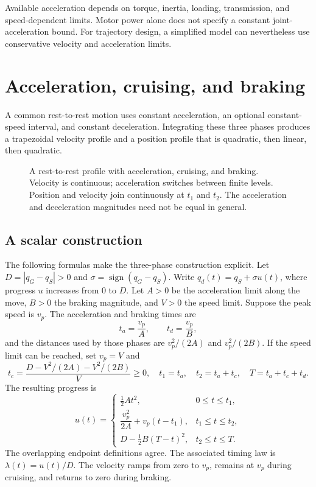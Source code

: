 Available acceleration depends on torque, inertia, loading, transmission,
and speed-dependent limits. Motor power alone does not specify a constant
joint-acceleration bound. For trajectory design, a simplified model can
nevertheless use conservative velocity and acceleration limits.

\section{Acceleration, cruising, and braking}
\label{sec:l12-trapezoid}
A common rest-to-rest motion uses constant acceleration, an optional
constant-speed interval, and constant deceleration. Integrating these
three phases produces a trapezoidal velocity profile and a position
profile that is quadratic, then linear, then quadratic.

\begin{figure}[htbp]
\centering
\caption{A rest-to-rest profile with acceleration, cruising, and braking.
Velocity is continuous; acceleration switches between finite levels.
Position and velocity join continuously at $t_1$ and $t_2$. The acceleration
and deceleration magnitudes need not be equal in general.}
\label{fig:l12-trapezoid}
\end{figure}

\subsection{A scalar construction}
The following formulas make the three-phase construction explicit. Let
$D=|q_G-q_S|>0$ and $\sigma=\operatorname{sign}(q_G-q_S)$.
Write $q_d(t)=q_S+\sigma u(t)$, where progress $u$ increases from 0 to $D$.
Let $A>0$ be the acceleration limit along the move, $B>0$ the braking
magnitude, and $V>0$ the speed limit. Suppose the peak speed is $v_p$.
The acceleration and braking times are
\[
 t_a=\frac{v_p}{A},\qquad t_d=\frac{v_p}{B},
\]
and the distances used by those phases are $v_p^2/(2A)$ and $v_p^2/(2B)$.
If the speed limit can be reached, set $v_p=V$ and
\begin{equation}
 t_c=\frac{D-V^2/(2A)-V^2/(2B)}{V}\ge0,
 \quad t_1=t_a,\quad t_2=t_a+t_c,\quad T=t_a+t_c+t_d.
 \label{eq:l12-times}
\end{equation}
The resulting progress is
\begin{equation}
 u(t)=\begin{cases}
 \tfrac12At^2,&0\le t\le t_1,\\
 \dfrac{v_p^2}{2A}+v_p(t-t_1),&t_1\le t\le t_2,\\
 D-\tfrac12B(T-t)^2,&t_2\le t\le T.
 \end{cases}
 \label{eq:l12-piecewise}
\end{equation}
The overlapping endpoint definitions agree. The associated timing law is
$\lambda(t)=u(t)/D$. The velocity ramps from zero to $v_p$, remains at
$v_p$ during cruising, and returns to zero during braking.


